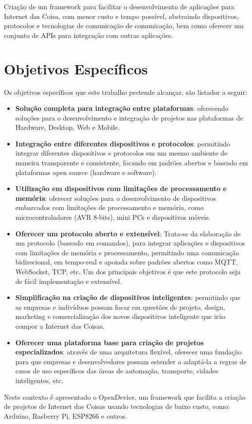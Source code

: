 Criação de um framework para facilitar o desenvolvimento de aplicações
para Internet das Coisa, com menor custo e tempo possível, abstraindo
dispositivos, protocolos e tecnologias de comunicação de comunicação,
bem como oferecer um conjunto de APIs para integração com outras aplicações.

\section{Objetivos Específicos}

Os objetivos específicos que este trabalho pretende alcançar, são
listador a seguir:
\begin{itemize}
\item \textbf{Solução completa para integração entre plataformas}: oferecendo
soluções para o desenvolvimento e integração de projetos nas plataformas
de Hardware, Desktop, Web e Mobile.
\item \textbf{Integração entre diferentes dispositivos e protocolos}: permitindo
integrar diferentes dispositivos e protocolos em um mesmo ambiente
de maneira transparente e consistente, focando em padrões abertos
e baseado em plataformas open source (hardware e software). 
\item \textbf{Utilização em dispositivos com limitações de processamento
e memória}: oferecer soluções para o desenvolvimento de dispositivos
embarcados com limitações de processamento e memória, como microcontroladores
(AVR 8-bits), mini PCs e dispositivos móveis.
\item \textbf{Oferecer um protocolo aberto e extensível}: Trata-se da elaboração
de um protocolo (baseado em comandos), para integrar aplicações e
dispositivos com limitações de memória e processamento, permitindo
uma comunicação bidirecional, em tempo-real e apoiada sobre padrões
abertos como MQTT, WebSocket, TCP, etc. Um dos principais objetivos
é que este protocolo seja de fácil implementação e extensível.
\item \textbf{Simplificação na criação de dispositivos inteligentes}: permitindo
que as empresas e indivíduos possam focar em questões de projeto,
design, marketing e comercialização dos novos dispositivos inteligente
que irão compor a Internet das Coisas.
\item \textbf{Oferecer uma plataforma base para criação de projetos especializados}:
através de uma arquitetura flexível, oferecer uma fundação para que
empresas e desenvolvedores possam estender a adaptá-la a regras de
casos de uso específicos das áreas de automação, transporte, cidades
inteligentes, etc.
\end{itemize}
Neste contexto é apresentado o OpenDevice, um framework que facilita
a criação de projetos de Internet das Coisas usando tecnologias de
baixo custo, como: Arduino\cite{url:arduino:intro}, Rasberry Pi\cite{url:raspberry},
ESP8266\cite{url:esp8266:espressif} e outros\cite{arduino-comp1,arduino-comp2,arduino-comp3}.

